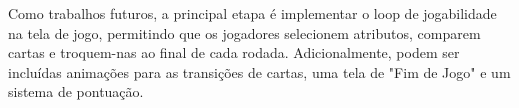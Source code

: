 \documentclass[a4paper, twocolumn]{article}
\begin{document}
Como trabalhos futuros, a principal etapa é implementar o loop de jogabilidade na tela de jogo, permitindo que os jogadores selecionem atributos, comparem cartas e troquem-nas ao final de cada rodada. Adicionalmente, podem ser incluídas animações para as transições de cartas, uma tela de "Fim de Jogo" e um sistema de pontuação.
\end{document}
